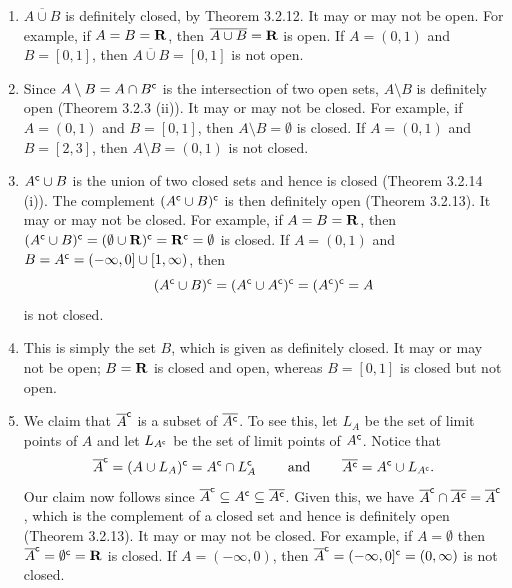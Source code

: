 \documentclass{lew98_solutions}
\begin{document}
\begin{solution}
    \begin{enumerate}
        \item \( \overline{A \cup B} \) is definitely closed, by Theorem 3.2.12. It may or may not be open. For example, if \( A = B = \mathbf{R} \), then \( \overline{A \cup B} = \mathbf{R} \) is open. If \( A = (0, 1) \) and \( B = [0, 1] \), then \( \overline{A \cup B} = [0, 1] \) is not open.

        \item Since \( A \setminus B = A \cap B^{\mathsf{c}} \) is the intersection of two open sets, \( A \setminus B \) is definitely open (Theorem 3.2.3 (ii)). It may or may not be closed. For example, if \( A = (0, 1) \) and \( B = [0, 1] \), then \( A \setminus B = \emptyset \) is closed. If \( A = (0, 1) \) and \( B = [2, 3] \), then \( A \setminus B = (0, 1) \) is not closed.

        \item \( A^{\mathsf{c}} \cup B \) is the union of two closed sets and hence is closed (Theorem 3.2.14 (i)). The complement \( (A^{\mathsf{c}} \cup B)^{\mathsf{c}} \) is then definitely open (Theorem 3.2.13). It may or may not be closed. For example, if \( A = B = \mathbf{R} \), then \( (A^{\mathsf{c}} \cup B)^{\mathsf{c}} = (\emptyset \cup \mathbf{R})^{\mathsf{c}} = \mathbf{R}^{\mathsf{c}} = \emptyset \) is closed. If \( A = (0, 1) \) and \( B = A^{\mathsf{c}} = (-\infty, 0] \cup [1, \infty) \), then
        \[
            (A^{\mathsf{c}} \cup B)^{\mathsf{c}} = (A^{\mathsf{c}} \cup A^{\mathsf{c}})^{\mathsf{c}} = (A^{\mathsf{c}})^{\mathsf{c}} = A
        \]
        is not closed.

        \item This is simply the set \( B \), which is given as definitely closed. It may or may not be open; \( B = \mathbf{R} \) is closed and open, whereas \( B = [0, 1] \) is closed but not open.

        \item We claim that \( \overline{A}^{\mathsf{c}} \) is a subset of \( \overline{A^{\mathsf{c}}} \). To see this, let \( L_A \) be the set of limit points of \( A \) and let \( L_{A^{\mathsf{c}}} \) be the set of limit points of \( A^{\mathsf{c}} \). Notice that
        \[
            \overline{A}^{\mathsf{c}} = (A \cup L_A)^{\mathsf{c}} = A^{\mathsf{c}} \cap L_A^{\mathsf{c}} \hspace{8mm} \text{and} \hspace{8mm} \overline{A^{\mathsf{c}}} = A^{\mathsf{c}} \cup L_{A^{\mathsf{c}}}.
        \]
        Our claim now follows since \( \overline{A}^{\mathsf{c}} \subseteq A^{\mathsf{c}} \subseteq \overline{A^{\mathsf{c}}} \). Given this, we have \( \overline{A}^{\mathsf{c}} \cap \overline{A^{\mathsf{c}}} = \overline{A}^{\mathsf{c}} \), which is the complement of a closed set and hence is definitely open (Theorem 3.2.13). It may or may not be closed. For example, if \( A = \emptyset \) then \( \overline{A}^{\mathsf{c}} = \emptyset^{\mathsf{c}} = \mathbf{R} \) is closed. If \( A = (-\infty, 0) \), then \( \overline{A}^{\mathsf{c}} = (-\infty, 0]^{\mathsf{c}} = (0, \infty) \) is not closed.
    \end{enumerate}
\end{solution}
\end{document}
